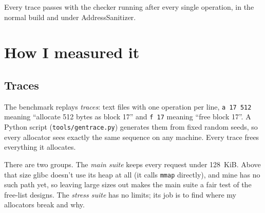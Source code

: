 \documentclass[11pt,letterpaper]{article}
\begin{document}
Every trace passes with the checker running after every single operation, in the normal build and under AddressSanitizer.

\section{How I measured it}
\label{sec:measure}

\subsection*{Traces}

The benchmark replays \emph{traces}: text files with one operation per line, \texttt{a 17 512} meaning ``allocate 512 bytes as block 17'' and \texttt{f 17} meaning ``free block 17''. A Python script (\texttt{tools/gentrace.py}) generates them from fixed random seeds, so every allocator sees exactly the same sequence on any machine. Every trace frees everything it allocates.

There are two groups. The \emph{main suite} keeps every request under 128~KiB. Above that size glibc doesn't use its heap at all (it calls \texttt{mmap} directly), and mine has no such path yet, so leaving large sizes out makes the main suite a fair test of the free-list designs. The \emph{stress suite} has no limits; its job is to find where my allocators break and why.
\end{document}
